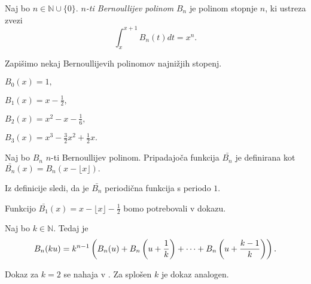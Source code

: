 \documentclass[mat1]{fmfdelo}
\begin{document}
\begin{definicija}
Naj bo $n \in \mathbb{N} \cup \{0\}.$ \emph{$n$-ti Bernoullijev polinom} $B_{n}$ je polinom stopnje $n$, ki ustreza zvezi
\begin{equation}
\int_{x}^{x+1} B_{n}(t) dt = x^{n}.
\end{equation}
\end{definicija}

\begin{primer}
Zapišimo nekaj Bernoullijevih polinomov najnižjih stopenj.

\( B_{0}(x) = 1, \)

\( B_{1}(x) = x - \frac{1}{2}, \)

\( B_{2}(x) = x^2 - x - \frac{1}{6}, \)

\( B_{3}(x) = x^3 - \frac{3}{2} x^2 + \frac{1}{2} x. \)
\end{primer}

\begin{definicija}
Naj bo $B_{n}$ $n$-ti Bernoullijev polinom. Pripadajoča funkcija $ \bar{B_{n}} $ je definirana kot $ \bar{B_{n}}(x) = B_{n}(x - \lfloor x \rfloor). $
\end{definicija}

\begin{opomba}
Iz definicije sledi, da je $ \bar{B_{n}} $ periodična funkcija s periodo $1$.
\end{opomba}

\begin{primer}
Funkcijo $ \bar{B_{1}}(x) = x - \lfloor x \rfloor - \frac{1}{2} $ bomo potrebovali v dokazu.
\end{primer}

\begin{trditev}
Naj bo $k \in \mathbb{N}$. Tedaj je
\begin{equation}
\label{Eq:B_{n}(ku)}
B_{n}(ku) = k^{n-1} \left ( B_{n}(u) + B_{n} \left( u + \frac{1}{k} \right) + \dots + B_{n} \left( u + \frac{k-1}{k} \right) \right).
\end{equation}
\end{trditev}

\begin{dokaz}
Dokaz za $k=2$ se nahaja v \cite[poglavje 6.2, str.~102 -- 103]{zetafunction}. Za splošen $k$ je dokaz analogen.
\end{dokaz}

\end{document}
